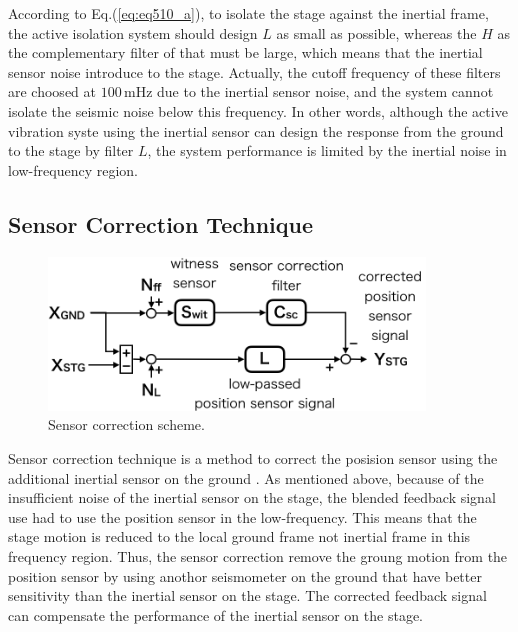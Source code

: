 According to Eq.(\ref{eq:eq510_a}), to isolate the stage against the inertial frame, the active isolation system should design $L$ as small as possible, whereas the $H$ as the complementary filter of that must be large, which means that the inertial sensor noise introduce to the stage. Actually, the cutoff frequency of these filters are choosed at $100\,\mathrm{mHz}$ due to the inertial sensor noise, and the system cannot isolate the seismic noise below this frequency. In other words, although the active vibration syste using the inertial sensor can design the response from the ground to the stage by filter $L$, the system performance is limited by the inertial noise in low-frequency region.

\subsection{Sensor Correction Technique} \label{sec:sec513}
\begin{figure}[h]
  \begin{center}   
    \includegraphics[width=10cm]{./img_chap5/img505.png}
    \caption{Sensor correction scheme.} \label{img:img505}
  \end{center}
\end{figure}
Sensor correction technique is a method to correct the posision sensor using the additional inertial sensor on the ground \cite{hua2005low}. As mentioned above, because of the insufficient noise of the inertial sensor on the stage, the blended feedback signal use had to use the position sensor in the low-frequency. This means that the stage motion is reduced to the local ground frame not inertial frame in this frequency region. Thus, the sensor correction remove the groung motion from the position sensor by using anothor seismometer on the ground that have better sensitivity than the inertial sensor on the stage. The corrected feedback signal can compensate the performance of the inertial sensor on the stage.

